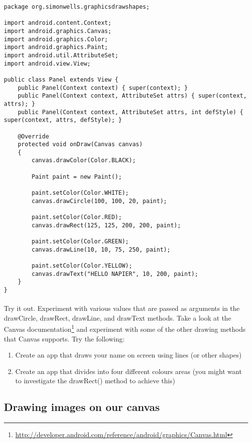 \begin{lstlisting}
package org.simonwells.graphicsdrawshapes;

import android.content.Context;
import android.graphics.Canvas;
import android.graphics.Color;
import android.graphics.Paint;
import android.util.AttributeSet;
import android.view.View;

public class Panel extends View {
    public Panel(Context context) { super(context); }
    public Panel(Context context, AttributeSet attrs) { super(context, attrs); }
    public Panel(Context context, AttributeSet attrs, int defStyle) { super(context, attrs, defStyle); }

    @Override
    protected void onDraw(Canvas canvas)
    {
        canvas.drawColor(Color.BLACK);

        Paint paint = new Paint();

        paint.setColor(Color.WHITE);
        canvas.drawCircle(100, 100, 20, paint);

        paint.setColor(Color.RED);
        canvas.drawRect(125, 125, 200, 200, paint);

        paint.setColor(Color.GREEN);
        canvas.drawLine(10, 10, 75, 250, paint);

        paint.setColor(Color.YELLOW);
        canvas.drawText("HELLO NAPIER", 10, 200, paint);
    }
}
\end{lstlisting}

\paragraph{} Try it out. Experiment with various values that are passed as arguments in the drawCircle, drawRect, drawLine, and drawText methods. Take a look at the Canvas documentation\footnote{\url{http://developer.android.com/reference/android/graphics/Canvas.html}} and experiment with some of the other drawing methods that Canvas supports. Try the following:

\begin{enumerate}
\item Create an app that draws your name on screen using lines (or other shapes)
\item Create an app that divides into four different colours areas (you might want to investigate the drawRect() method to achieve this)
\end{enumerate}

\subsection{Drawing images on our canvas}
